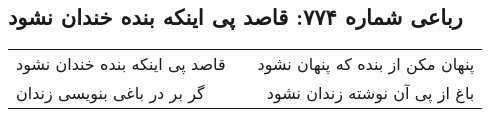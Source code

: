 \begin{center}
\section*{رباعی شماره ۷۷۴: قاصد پی اینکه بنده خندان نشود}
\label{sec:0774}
\begin{longtable}{l p{0.5cm} r}
قاصد پی اینکه بنده خندان نشود
&&
پنهان مکن از بنده که پنهان نشود
\\
گر بر در باغی بنویسی زندان
&&
باغ از پی آن نوشته زندان نشود
\\
\end{longtable}
\end{center}
